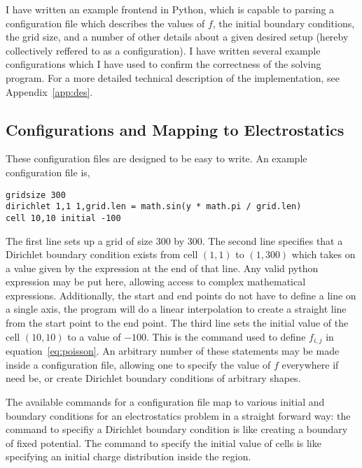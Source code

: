I have written an example frontend in Python, which is capable to parsing a configuration file which describes the
values of $f$, the initial boundary conditions, the grid size, and a number of other details about a given desired
setup (hereby collectively reffered to as a configuration). I have written several example configurations which I have used to
confirm the correctness of the solving program. For a more detailed technical description of the implementation, see Appendix~\ref{app:des}.

\subsection{Configurations and Mapping to Electrostatics}

These configuration files are designed to be easy to write. An example configuration file is,

\begin{addmargin}[4em]{2em}%
\begin{singlespace}
\texttt{gridsize 300}\\
\texttt{dirichlet 1,1 1,grid.len = math.sin(y * math.pi / grid.len)}\\
\texttt{cell 10,10 initial -100}
\end{singlespace}
\end{addmargin}

The first line sets up a grid of size 300 by 300. The second line specifies that a Dirichlet boundary condition exists
from cell $(1, 1)$ to $(1, 300)$ which takes on a value given by the expression at the end of that line. Any valid python
expression may be put here, allowing access to complex mathematical expressions. Additionally, the start and end points
do not have to define a line on a single axis, the program will do a linear interpolation to create a straight line from
	the start point to the end point.
The third line sets the initial value of
the cell $(10, 10)$ to a value of $-100$. This is the command used to define $f_{i,j}$ in equation~\ref{eq:poisson}.
An arbitrary number of these statements may be made inside a configuration file, allowing one to specify the value of
$f$ everywhere if need be, or create Dirichlet boundary conditions of arbitrary shapes.

The available commands for a configuration file map to various initial and boundary conditions for an electrostatics problem
in a straight forward way: the command to specifiy a Dirichlet boundary condition is like creating a boundary of fixed potential.
The command to specify the initial value of cells is like specifying an initial charge distribution inside the region.

